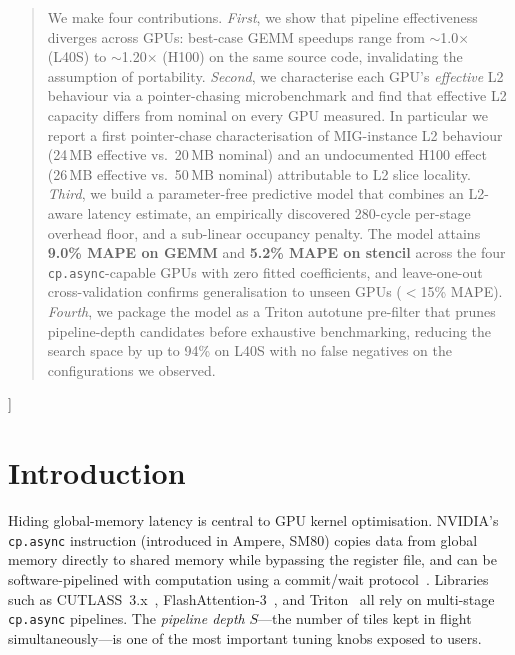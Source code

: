 \documentclass[10pt,twocolumn]{article}
\newcommand{\cpasync}{\texttt{cp.async}}
\newcommand{\highlight}[1]{\colorbox{ummaize!35}{\textbf{#1}}}
\begin{document}
\begin{@twocolumnfalse}
\begin{quote}
We make four contributions.  \emph{First}, we show that pipeline
effectiveness diverges across GPUs: best-case GEMM speedups range
from $\sim$1.0$\times$ (L40S) to $\sim$1.20$\times$ (H100) on the
same source code, invalidating the assumption of portability.
\emph{Second}, we characterise each GPU's \emph{effective} L2
behaviour via a pointer-chasing microbenchmark and find that
effective L2 capacity differs from nominal on every GPU measured.
In particular we report a first pointer-chase characterisation of
MIG-instance L2 behaviour (24\,MB effective vs.\ 20\,MB nominal) and
an undocumented H100 effect (26\,MB effective vs.\ 50\,MB nominal)
attributable to L2 slice locality.  \emph{Third}, we build a
parameter-free predictive model that combines an L2-aware latency
estimate, an empirically discovered 280-cycle per-stage overhead
floor, and a sub-linear occupancy penalty.  The model attains
\highlight{9.0\% MAPE on GEMM} and \highlight{5.2\% MAPE on stencil}
across the four \cpasync{}-capable GPUs with zero fitted
coefficients, and leave-one-out cross-validation confirms
generalisation to unseen GPUs ($<$15\% MAPE).  \emph{Fourth}, we
package the model as a Triton autotune pre-filter that prunes
pipeline-depth candidates before exhaustive benchmarking, reducing
the search space by up to 94\% on L40S with no false negatives on
the configurations we observed.
\end{quote}
\vspace{1em}
\end{@twocolumnfalse}]

\section{Introduction}
\label{sec:intro}

Hiding global-memory latency is central to GPU kernel optimisation.
NVIDIA's \cpasync{} instruction (introduced in Ampere, SM80) copies
data from global memory directly to shared memory while bypassing
the register file, and can be software-pipelined with computation
using a commit/wait protocol~\cite{cuda_guide}.  Libraries such as
CUTLASS~3.x~\cite{cutlass3}, FlashAttention-3~\cite{flashattn3}, and
Triton~\cite{triton} all rely on multi-stage \cpasync{} pipelines.
The \emph{pipeline depth} $S$---the number of tiles kept in flight
simultaneously---is one of the most important tuning knobs exposed
to users.
\end{document}
